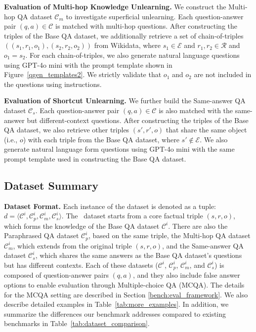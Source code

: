 \noindent\textbf{Evaluation of Multi-hop Knowledge Unlearning.}
We construct the Multi-hop QA dataset $\mathcal{C}_{m}$ to investigate superficial unlearning.
Each question-answer pair $(q,a) \in \mathcal{C}$ is matched with multi-hop questions.
After constructing the triples of the Base QA dataset, we additionally retrieve a set of chain-of-triples $((s_{1}, r_{1}, o_{1}), (s_{2}, r_{2}, o_{2}))$ from Wikidata, where $s_{1} \in \mathcal{E}$ and $r_{1}, r_{2} \in \mathcal{R}$ and $o_{1} = s_{2}$.
For each chain-of-triples, we also generate natural language questions using GPT-4o mini with the prompt template shown in Figure~\ref{qgen_templates2}.
We strictly validate that $o_{1}$ and $o_{2}$ are not included in the questions using instructions.


\noindent\textbf{Evaluation of Shortcut Unlearning.}
We further build the Same-answer QA dataset $\mathcal{C}_{s}$.
Each question-answer pair $(q,a) \in \mathcal{C}$ is also matched with the same-answer but different-context questions.
After constructing the triples of the Base QA dataset, we also retrieve other triples $(s',r',o)$ that share the same object (i.e., $o$) with each triple from the Base QA dataset, where $s' \notin \mathcal{E}$.
We also generate natural language form questions using GPT-4o mini with the same prompt template used in constructing the Base QA dataset.







\subsection{Dataset Summary}
\noindent\textbf{Dataset Format.}
% 
Each instance of the dataset is denoted as a tuple: $d = \langle \mathcal{C}^{i}, \mathcal{C}_{p}^{i}, \mathcal{C}_{m}^{i}, \mathcal{C}_{s}^{i} \rangle$.
The \ourdata~dataset starts from a core factual triple \( (s, r, o) \), which forms the knowledge of the Base QA dataset \( \mathcal{C}^{i} \). There are also the Paraphrased QA dataset \( \mathcal{C}_{p}^{i} \), based on the same triple, the Multi-hop QA dataset \( \mathcal{C}_{m}^{i} \), which extends from the original triple \( (s, r, o) \), and the Same-answer QA dataset \( \mathcal{C}_{s}^{i} \), which shares the same answers as the Base QA dataset's questions but has different contexts. Each of these datasets ($\mathcal{C}^{i}$, $\mathcal{C}_{p}^{i}$, $\mathcal{C}_{m}^{i}$, and $\mathcal{C}_{s}^{i}$) is composed of question-answer pairs \( (q, a) \), and they also include false answer options to enable evaluation through Multiple-choice QA (MCQA). The details for the MCQA setting are described in Section \ref{bench:eval_framework}.
We also describe detailed examples in Table~\ref{tab:more_examples}.
In addition, we summarize the differences our benchmark addresses compared to existing benchmarks \citep{shi2024muse, tian2024forget, li2024wmdp, maini2024tofu, jin2024rwku} in Table~\ref{tab:dataset_comparison}.



